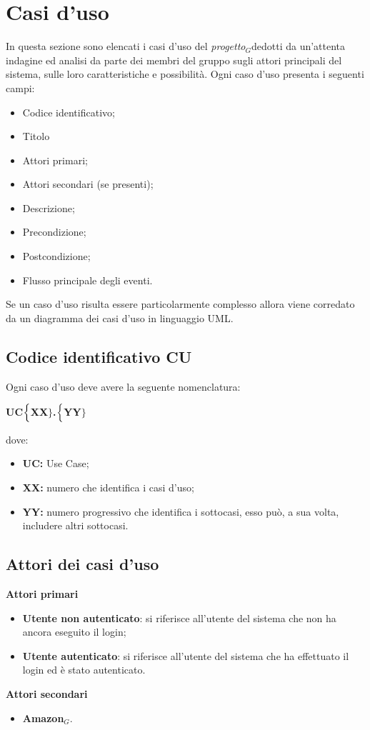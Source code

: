 \chapter{Casi d'uso}
\label{UC}
In questa sezione sono elencati i casi d'uso del \textit{progetto$_{G}$}dedotti da un'attenta indagine ed analisi da parte dei membri del gruppo sugli attori principali del sistema, sulle loro caratteristiche e possibilità.
Ogni caso d'uso presenta i seguenti campi:
\begin{itemize}
	\item Codice identificativo;
	\item Titolo
	\item Attori primari;
	\item Attori secondari (se presenti);
	\item Descrizione;
	\item Precondizione;
	\item Postcondizione;
	\item Flusso principale degli eventi.
\end{itemize}
Se un caso d'uso risulta essere particolarmente complesso allora viene corredato da un diagramma dei casi d'uso in linguaggio UML.
\section{Codice identificativo CU}
Ogni caso d'uso deve avere la seguente nomenclatura:
\begin{center}
	\textbf{UC$\Bigl\{$XX$\Bigr\}$.$\Bigl\{$YY$\Bigr\}$}
\end{center}
dove:
\begin{itemize}
	\item \textbf{UC:} Use Case;
	\item \textbf{{XX}:} numero che identifica i casi d'uso;
	\item \textbf{{YY}:} numero progressivo che identifica i sottocasi, esso può, a sua volta, includere altri sottocasi.
\end{itemize}

\section{Attori dei casi d'uso}
\textbf{Attori primari}
\begin{itemize}
	\item \textbf{Utente non autenticato}: si riferisce all'utente del sistema che non ha ancora eseguito il login;
	\item \textbf{Utente autenticato}: si riferisce all'utente del sistema che ha effettuato il login ed è stato autenticato.
\end{itemize}
\textbf{Attori secondari}
\begin{itemize}
	\item \textbf{Amazon$_{G}$}.
\end{itemize}

